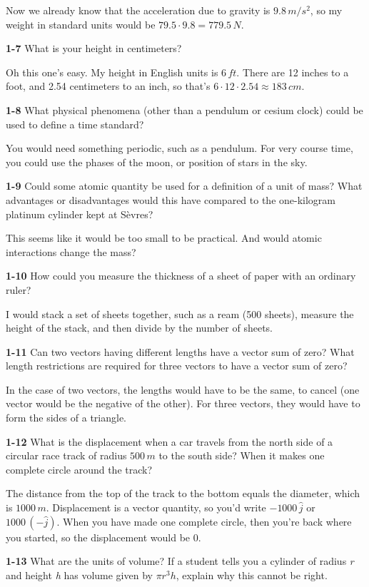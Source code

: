 \documentclass{amsart}
\begin{document}
Now we already know that the acceleration due to gravity is $9.8 \, m/s^{2}$,
so my weight in standard units would be $79.5 \cdot 9.8 = 779.5 \, N$.

\textbf{1-7} What is your height in centimeters?

Oh this one's easy.  My height in English units is $6 \, ft$.
There are 12 inches to a foot, and 2.54 centimeters to an inch,
so that's $6 \cdot 12 \cdot 2.54 \approx 183 \, cm$.

\textbf{1-8} What physical phenomena (other than a pendulum or cesium clock)
could be used to define a time standard?

You would need something periodic, such as a pendulum.  For very course time,
you could use the phases of the moon, or position of stars in the sky.

\textbf{1-9} Could some atomic quantity be used for a definition of a unit of mass?
What advantages or disadvantages would this have compared to the one-kilogram platinum
cylinder kept at S\`{e}vres?

This seems like it would be too small to be practical.
And would atomic interactions change the mass?

\textbf{1-10} How could you measure the thickness of a sheet of paper with an ordinary ruler?

I would stack a set of sheets together, such as a ream (500 sheets), measure the height of the stack,
and then divide by the number of sheets.

\textbf{1-11} Can two vectors having different lengths have a vector sum of zero?
What length restrictions are required for three vectors to have a vector sum of zero?

In the case of two vectors, the lengths would have to be the same, to cancel (one vector
would be the negative of the other).
For three vectors, they would have to form the sides of a triangle.

\textbf{1-12} What is the displacement when a car travels from the north side of a circular
race track of radius $500 \, m$ to the south side?
When it makes one complete circle around the track?

The distance from the top of the track to the bottom equals the diameter, which is $1000 \, m$.
Displacement is a vector quantity, so you'd write $-1000 \, \hat j$ or $1000 \, (- \hat j)$.
When you have made one complete circle, then you're back where you started, so the displacement
would be 0.

\textbf{1-13} What are the units of volume?
If a student tells you a cylinder of radius \emph{r} and height \emph{h} has volume given by $\pi r^{3} h$,
explain why this cannot be right.
\end{document}
